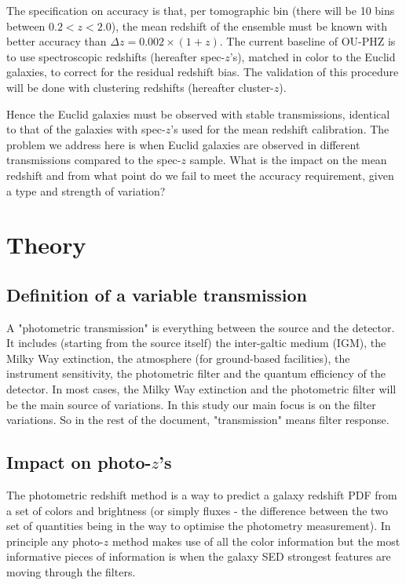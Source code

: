 \documentclass[11pt]{article}
\begin{document}
The specification on accuracy is that, per tomographic bin (there will
be 10 bins between \(0.2 <z < 2.0\)), the mean redshift of the ensemble
must be known with better accuracy than \(\Delta z = 0.002\times(1+z)\).
The current baseline of OU-PHZ is to use spectroscopic redshifts
(hereafter spec-\(z\)'s), matched in color to the Euclid galaxies, to
correct for the residual redshift bias. The validation of this procedure
will be done with clustering redshifts (hereafter cluster-\(z\)).

Hence the Euclid galaxies must be observed with stable transmissions,
identical to that of the galaxies with spec-\(z\)'s used for the mean
redshift calibration. The problem we address here is when Euclid
galaxies are observed in different transmissions compared to the
spec-\(z\) sample. What is the impact on the mean redshift and from what
point do we fail to meet the accuracy requirement, given a type and
strength of variation?

\section{Theory}\label{theory}

\subsection{Definition of a variable
transmission}\label{definition-of-a-variable-transmission}

A "photometric transmission" is everything between the source and the
detector. It includes (starting from the source itself) the inter-galtic
medium (IGM), the Milky Way extinction, the atmosphere (for ground-based
facilities), the instrument sensitivity, the photometric filter and the
quantum efficiency of the detector. In most cases, the Milky Way
extinction and the photometric filter will be the main source of
variations. In this study our main focus is on the filter variations. So
in the rest of the document, "transmission" means filter response.

\subsection{\texorpdfstring{Impact on
photo-\(z\)'s}{Impact on photo-z's}}\label{impact-on-photo-zs}

The photometric redshift method is a way to predict a galaxy redshift
PDF from a set of colors and brightness (or simply fluxes - the
difference between the two set of quantities being in the way to
optimise the photometry measurement). In principle any photo-\(z\)
method makes use of all the color information but the most informative
pieces of information is when the galaxy SED strongest features are
moving through the filters.
\end{document}
